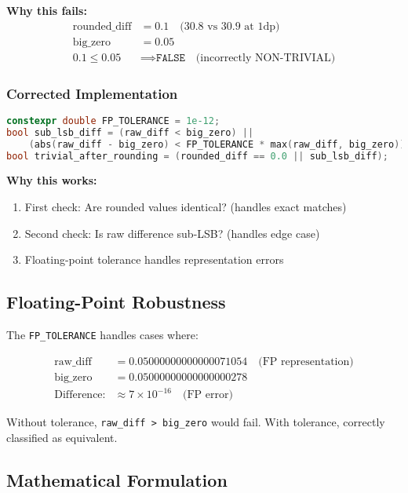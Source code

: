 \textbf{Why this fails:}
\begin{align*}
    \text{rounded\_diff} &= 0.1 \quad \text{(30.8 vs 30.9 at 1dp)} \\
    \text{big\_zero} &= 0.05 \\
    0.1 \leq 0.05 &\implies \texttt{FALSE} \quad \text{(incorrectly NON-TRIVIAL)}
\end{align*}

\subsubsection{Corrected Implementation}

\begin{lstlisting}[language=C++]
constexpr double FP_TOLERANCE = 1e-12;
bool sub_lsb_diff = (raw_diff < big_zero) ||
    (abs(raw_diff - big_zero) < FP_TOLERANCE * max(raw_diff, big_zero));
bool trivial_after_rounding = (rounded_diff == 0.0 || sub_lsb_diff);
\end{lstlisting}

\textbf{Why this works:}
\begin{enumerate}
    \item First check: Are rounded values identical? (handles exact matches)
    \item Second check: Is raw difference sub-LSB? (handles edge case)
    \item Floating-point tolerance handles representation errors
\end{enumerate}

\subsection{Floating-Point Robustness}

The \texttt{FP\_TOLERANCE} handles cases where:

\begin{align*}
    \text{raw\_diff} &= 0.05000000000000071054 \quad \text{(FP representation)} \\
    \text{big\_zero} &= 0.05000000000000000278 \\
    \text{Difference:} &\approx 7 \times 10^{-16} \quad \text{(FP error)}
\end{align*}

Without tolerance, \texttt{raw\_diff > big\_zero} would fail. With tolerance, correctly classified as equivalent.

\subsection{Mathematical Formulation}

